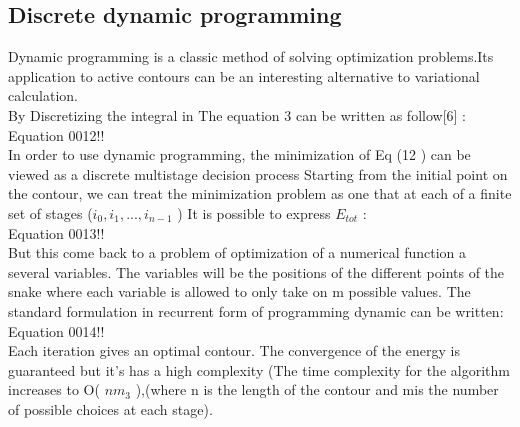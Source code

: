\subsection{Discrete dynamic programming}\label{subsec:discrete-dynamic-programming}
\hspace{1cm}Dynamic programming is a classic method of solving optimization problems.Its
application to active contours can be an interesting alternative to variational
calculation.\\
By Discretizing the integral in The equation 3 can be written as follow[6] :\\
Equation 0012!!\\
In order to use dynamic programming, the minimization of Eq (12 ) can be
viewed as a discrete multistage decision process Starting from the initial point
on the contour, we can treat the minimization problem as one that at each of a
finite set of stages ($i_{0},i_{1},..., i_{n-1}$ ) It is possible to express $E_{tot}$ :\\
Equation 0013!!\\
But this come back to a problem of optimization of a numerical function a
several variables. The variables will be the positions of the different points of
the snake where each variable is allowed to only take on m possible values. The
standard formulation in recurrent form of programming dynamic can be
written:\\
Equation 0014!!\\
Each iteration gives an optimal contour. The convergence of the energy is
guaranteed but it’s has a high complexity (The time complexity for the
algorithm increases to O( $nm_3$ ),(where n is the length of the contour and mis
the number of possible choices at each stage).
